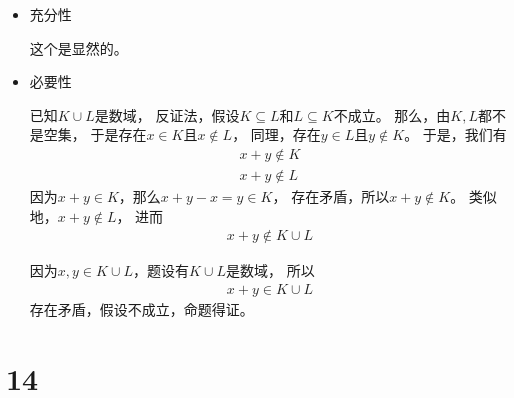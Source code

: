 \documentclass{article}
\begin{document}
\begin{itemize}
      \item 充分性

            这个是显然的。

      \item 必要性

            已知$K \cup L$是数域，
            反证法，假设$K \subseteq L$和$L \subseteq K$不成立。
            那么，由$K, L$都不是空集，
            于是存在$x \in K$且$x \notin L$，
            同理，存在$y \in L$且$y \notin K$。
            于是，我们有
            \begin{align*}
                  x + y \notin K \\
                  x + y \notin L
            \end{align*}
            因为$x + y \in K$，那么$x + y - x = y \in K$，
            存在矛盾，所以$x + y \notin K$。
            类似地，$x + y \notin L$，
            进而
            \begin{align*}
                  x + y \notin K \cup L
            \end{align*}

            因为$x,y \in K \cup L$，题设有$K \cup L$是数域，
            所以
            \begin{align*}
                  x + y \in K \cup L
            \end{align*}
            存在矛盾，假设不成立，命题得证。
\end{itemize}

\section*{14}
\end{document}
